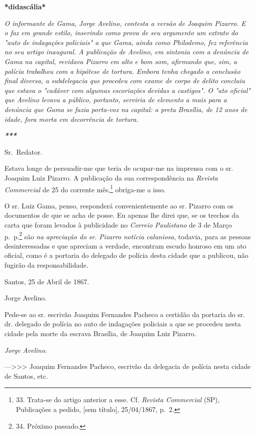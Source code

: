 \textbf{*didascália*}

\emph{O informante de Gama, Jorge Avelino, contesta a versão de Joaquim
Pizarro. E o faz em grande estilo, inserindo como prova de seu argumento
um extrato do "auto de indagações policiais" a que Gama, ainda como
Philodemo, fez referência no seu artigo inaugural. A publicação de
Avelino, em sintonia com a denúncia de Gama na capital, revidava Pizarro
em alto e bom som, afirmando que, sim, a polícia trabalhou com a
hipótese de tortura. Embora tenha chegado a conclusão final diversa, a
subdelegacia que procedeu com exame de corpo de delito concluiu que
estava o "cadáver com algumas escoriações devidas a castigos". O "ato
oficial" que Avelino levava a público, portanto, serviria de elemento a
mais para a denúncia que Gama se fazia porta-voz na capital: a preta
Brasília, de 12 anos de idade, fora morta em decorrência de tortura.}

\textbf{\emph{***}}

Sr.~Redator.

Estava longe de persuadir-me que teria de ocupar-me na imprensa com o
sr. Joaquim Luiz Pizarro. A publicação da sua correspondência na
\emph{Revista Commercial} de 25 do corrente mês,\footnote{33. Trata-se
  do artigo anterior a esse. Cf. \emph{Revista Commercial} (SP),
  Publicações a pedido, {[}sem título{]}, 25/04/1867, p.~2.} obriga-me a
isso.

O sr. Luiz Gama, penso, responderá convenientemente ao sr. Pizarro com
os documentos de que se acha de posse. Eu apenas lhe direi que, se os
trechos da carta que foram levados à publicidade no \emph{Correio
Paulistano} de 3 de Março p.~p.\textsuperscript{⁠}\footnote{34. Próximo
  passado.} são \emph{na apreciação do sr. Pizarro notícia caluniosa},
todavia, para as pessoas desinteressadas e que apreciam a verdade,
encontram escudo honroso em um ato oficial, como é a portaria do
delegado de polícia desta cidade que a publicou, não fugirão da
responsabilidade.

Santos, 25 de Abril de 1867.

Jorge Avelino.

Pede-se ao sr. escrivão Joaquim Fernandes Pacheco a certidão da portaria
do sr. dr. delegado de polícia no auto de indagações policiais a que se
procedeu nesta cidade pela morte da escrava Brasília, de Joaquim Luiz
Pizarro.

\emph{Jorge Avelino}.

---\textgreater\textgreater\textgreater{} Joaquim Fernandes Pacheco,
escrivão da delegacia de polícia nesta cidade de Santos, etc.

